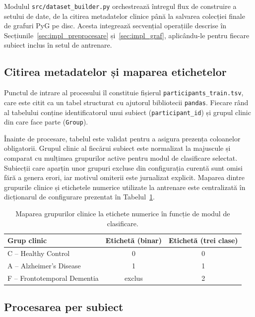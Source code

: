 \documentclass[12pt,a4paper]{report}
\theoremstyle{definition}
\theoremstyle{remark}
\begin{document}
Modulul \texttt{src/dataset\_builder.py} orchestrează întregul flux de construire a setului de date, de la citirea metadatelor clinice până la salvarea colecției finale de grafuri PyG pe disc. Acesta integrează secvențial operațiile descrise în Secțiunile~\ref{sec:impl_preprocesare} și~\ref{sec:impl_graf}, aplicându-le pentru fiecare subiect inclus în setul de antrenare.

\subsection{Citirea metadatelor și maparea etichetelor}

Punctul de intrare al procesului îl constituie fișierul \texttt{participants\_train.tsv}, care este citit ca un tabel structurat cu ajutorul bibliotecii \texttt{pandas}. Fiecare rând al tabelului conține identificatorul unui subiect (\texttt{participant\_id}) și grupul clinic din care face parte (\texttt{Group}).

Înainte de procesare, tabelul este validat pentru a asigura prezența coloanelor obligatorii. Grupul clinic al fiecărui subiect este normalizat la majuscule și comparat cu mulțimea grupurilor active pentru modul de clasificare selectat. Subiecții care aparțin unor grupuri excluse din configurația curentă sunt omisi fără a genera erori, iar motivul omiterii este jurnalizat explicit. Maparea dintre grupurile clinice și etichetele numerice utilizate la antrenare este centralizată în dicționarul de configurare prezentat în Tabelul~\ref{tab:label_mapping}.

\begin{table}[H]
    \centering
    \caption{Maparea grupurilor clinice la etichete numerice în funcție de modul de clasificare.}
    \label{tab:label_mapping}
    \begin{tabular}{|l|c|c|}
        \hline
        \textbf{Grup clinic} & \textbf{Etichetă (binar)} & \textbf{Etichetă (trei clase)} \\
        \hline
        C -- Healthy Control & 0 & 0 \\
        \hline
        A -- Alzheimer's Disease & 1 & 1 \\
        \hline
        F -- Frontotemporal Dementia & exclus & 2 \\
        \hline
    \end{tabular}
\end{table}

\subsection{Procesarea per subiect}
\end{document}
